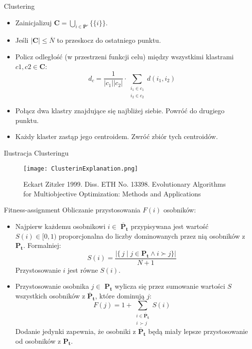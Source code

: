 \documentclass{beamer}
\begin{document}
\begin{frame}{Clustering}
\begin{itemize}
    \item Zainicjalizuj $\boldsymbol{C} = \bigcup_{i\in\boldsymbol{\overline{P}'}} \{\{ i \}\}$.
    \item Jeśli $\vert \boldsymbol{C} \vert \leq \overline{N}$ to przeskocz do ostatniego punktu.
    \item Policz odległość (w przestrzeni funkcji celu) między wszystkimi klastrami $c1, c2 \in \boldsymbol{C}$:
    $$d_c = \frac{1}{\vert c_1 \vert \vert c_2 \vert}\cdot  \sum_{\substack{i_1\in c_1 \\ i_2 \in c_2}} d(i_1, i_2)$$
    \item Połącz dwa klastry znajdujące się najbliżej siebie. Powróć do drugiego punktu.
    \item Każdy klaster zastąp jego centroidem. Zwróć zbiór tych centroidów.
\end{itemize}
\end{frame}

\begin{frame}{Ilustracja Clusteringu}
\begin{figure}[htp]
    \centering
    \texttt{[image: ClusterinExplanation.png]}
    \caption{Eckart Zitzler 1999. Diss. ETH No. 13398. Evolutionary Algorithms for Multiobjective Optimization: Methods and Applications}
\end{figure}
\end{frame}


\begin{frame}{Fitness-assignment}
Obliczanie przystosowania $F(i)$ osobników:
\begin{itemize}
    \item Najpierw każdemu osobnikowi $i \in$ $\boldsymbol{\overline{P}_t}$ przypisywana jest wartość $S(i) \in [0, 1)$ proporcjonalna do liczby dominowanych przez nią osobników z $\boldsymbol{{P}_t}$. Formalniej:
    $$S(i) = \frac{\vert\{ \,j\;\vert\; j\in \boldsymbol{{P}_t} \wedge i \succ j\} \vert}{N+1}$$
    Przystosowanie $i$ jest równe $S(i)$.
    \item Przystosowanie osobnika $j \in$ $\boldsymbol{{P}_t}$ wylicza się przez sumowanie wartości $S$ wszystkich osobników z $\boldsymbol{\overline{P}_t}$, które dominują $j$:
    $$F(j) = 1 +  \sum_{\substack{i\in \boldsymbol{\overline{P}_t} \\ i\, \succ j}} S(i)$$
    Dodanie jedynki zapewnia, że osobniki z $\boldsymbol{\overline{P}_t}$ będą miały lepsze przystosowanie od osobników z $\boldsymbol{{P}_t}$.
\end{itemize}
\end{frame}
\end{document}
